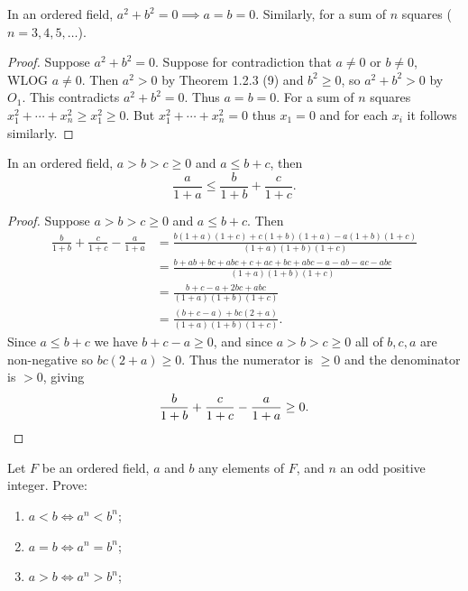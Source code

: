 \begin{tcolorbox}[title=Problem 2, breakable]
    In an ordered field, $a^2 + b^2 = 0 \implies a = b = 0$.
    Similarly, for a sum of $n$ squares ($n = 3, 4, 5, \ldots$).
\end{tcolorbox}

\begin{proof}
    Suppose $a^2 + b^2 = 0$. Suppose for contradiction that $a \ne 0$ or $b \ne 0$,
    WLOG $a \ne 0$. Then $a^2 > 0$ by Theorem 1.2.3 (9) and $b^2 \ge 0$, so
    $a^2 + b^2 > 0$ by $O_1$. This contradicts $a^2 + b^2 = 0$. Thus $a = b = 0$.
    For a sum of $n$ squares $x_1^2 + \cdots + x_n^2 \ge x_1^2 \ge 0$.
    But $x_1^2 + \cdots + x_n^2 = 0$ thus $x_1 = 0$ and for each $x_i$ it follows similarly.
\end{proof}


\begin{tcolorbox}[title=Problem 3, breakable]
    In an ordered field, $a > b > c \ge 0$ and $a \le b + c$, then 
    \[\frac{a}{1 + a} \le \frac{b}{1 + b} + \frac{c}{1 + c}.\]
\end{tcolorbox}

\begin{proof}
    Suppose $a > b > c \ge 0$ and $a \le b + c$.
    Then 
    \begin{align*}
    \frac{b}{1 + b} + \frac{c}{1 + c} - \frac{a}{1 + a} 
    &= \frac{b(1 + a)(1 + c) + c(1 + b)(1 + a) - a(1 + b)(1 + c)}{(1 + a)(1 + b)(1 + c)} \\
    &= \frac{b + ab + bc + abc + c + ac + bc + abc - a - ab - ac - abc}{(1+a)(1+b)(1+c)} \\
    &= \frac{b + c - a + 2bc + abc}{(1+a)(1+b)(1+c)} \\
    &= \frac{(b + c - a) + bc(2 + a)}{(1+a)(1+b)(1+c)}.
    \end{align*}
    Since $a \le b + c$ we have $b + c - a \ge 0$, and since $a > b > c \ge 0$ all of
    $b, c, a$ are non-negative so $bc(2 + a) \ge 0$. Thus the numerator is $\ge 0$
    and the denominator is $> 0$, giving
    \[\frac{b}{1+b} + \frac{c}{1+c} - \frac{a}{1+a} \ge 0. \qedhere\]
\end{proof}

\begin{tcolorbox}[title=Problem 5, breakable]
    Let $F$ be an ordered field, $a$ and $b$ any elements of $F$,
        and $n$ an odd positive integer. Prove:
    \begin{enumerate}
        \item $a < b \iff a^n < b^n$;
        \item $a = b \iff a^n = b^n$;
        \item $a > b \iff a^n > b^n$;
    \end{enumerate}
\end{tcolorbox}


